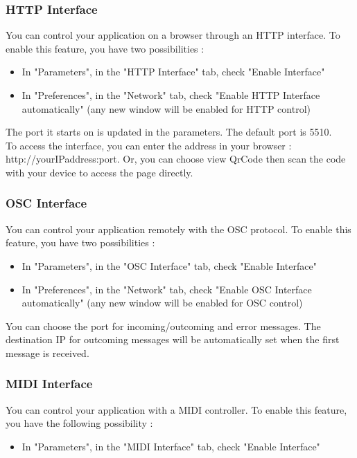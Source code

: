 \documentclass[a4paper]{article}
\begin{document}
\subsubsection{HTTP Interface}
	You can control your application on a browser through an HTTP interface. To enable this feature, you have two possibilities :
	\begin{itemize}
	\item In "Parameters", in the "HTTP Interface" tab, check "Enable Interface"
	\item In "Preferences", in the  "Network" tab, check "Enable HTTP Interface automatically" (any new window will be enabled for HTTP control)
	\end{itemize}
	
The port it starts on is updated in the parameters. The default port is 5510.\\
	To access the interface, you can enter the address in your browser : http://yourIPaddress:port.	
	Or, you can choose view QrCode then scan the code with your device to access the page directly. 

\subsubsection{OSC Interface}
	You can control your application remotely with the OSC protocol. 
	To enable this feature, you have two possibilities :
	\begin{itemize}
	\item In "Parameters", in the "OSC Interface" tab, check "Enable Interface"
	\item In "Preferences", in the "Network" tab, check "Enable OSC Interface automatically" (any new window will be enabled for OSC control)
	\end{itemize}
	You can choose the port for incoming/outcoming and error messages. The destination IP for outcoming messages will be automatically set when the first message is received. 

\subsubsection{MIDI Interface}
	You can control your application with a MIDI controller. To enable this feature, you have the following possibility :
	\begin{itemize}
	\item In "Parameters", in the "MIDI Interface" tab, check "Enable Interface"
	\end{itemize}
\end{document}
